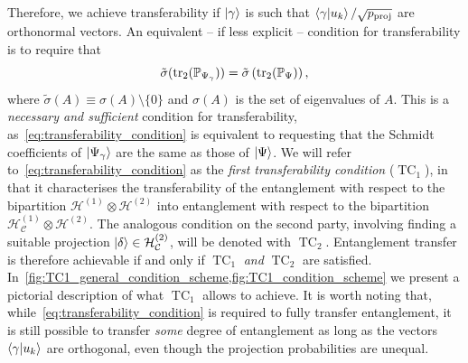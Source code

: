 \documentclass[
	aps, pra,
	superscriptaddress, twocolumn,
	floatfix,
	10pt
]{revtex4-1}
\newcommand{\on}[1]{\operatorname{#1}}
\newcommand{\parTitle}[1]{\noindent{\color{Mahogany}(\emph{#1})}}
\newcommand{\PP}{\mathbb{P}}
\newcommand{\calC}{{\mathcal{C}}}
\newcommand{\calH}{{\mathcal{H}}}
\newcommand{\calW}{{\mathcal{W}}}
\newcommand{\HC}{\calH_\calC}
\newcommand{\HW}{\calH_\calW}
\renewcommand{\parTitle}[1]{}
\begin{document}

\parTitle{Summary of conclusions}
Therefore, we achieve transferability if $\ket\gamma$ is such that
$\braket{\gamma}{u_k}/{\sqrt{p_{\on{proj}}}}$ are orthonormal vectors.
An equivalent -- if less explicit -- condition for transferability is to require that%
\begin{equation}
    \tilde\sigma(\tr_2(\PP_{\Psi_\gamma})) =
    \tilde\sigma\left(
        \tr_2(\PP_\Psi)
    \right),
    \label{eq:transferability_condition}
\end{equation}
where $\tilde\sigma(A)\equiv\sigma(A)\setminus\{0\}$ and $\sigma(A)$ is the set of eigenvalues of $A$.
This is a \emph{necessary and sufficient} condition for transferability, as~\cref{eq:transferability_condition} is equivalent to requesting that the Schmidt coefficients of $\ket{\Psi_\gamma}$ are the same as those of $\ket{\Psi}$.
We will refer to~\cref{eq:transferability_condition} as the \emph{first transferability condition} ($\on{TC}_1$), in that it characterises the transferability of the entanglement with respect to the bipartition $\calH^{(1)}\otimes\calH^{(2)}$ into entanglement with respect to the bipartition $\HC^{(1)}\otimes\calH^{(2)}$.
The analogous condition on the second party, involving finding a suitable projection $\ket\delta\in\HC^{(2)}$, will be denoted with $\on{TC}_2$.
Entanglement transfer is therefore achievable if and only if $\on{TC}_1$ \emph{and} $\on{TC}_2$ are satisfied.
In~\cref{fig:TC1_general_condition_scheme,fig:TC1_condition_scheme} we present a pictorial description of what $\on{TC}_1$ allows to achieve.
It is worth noting that, while~\cref{eq:transferability_condition} is required to fully transfer entanglement, it is still possible to transfer \textit{some} degree of entanglement as long as the vectors  $\braket{\gamma}{u_k}$ are orthogonal, even though the projection probabilities are unequal.
\end{document}
